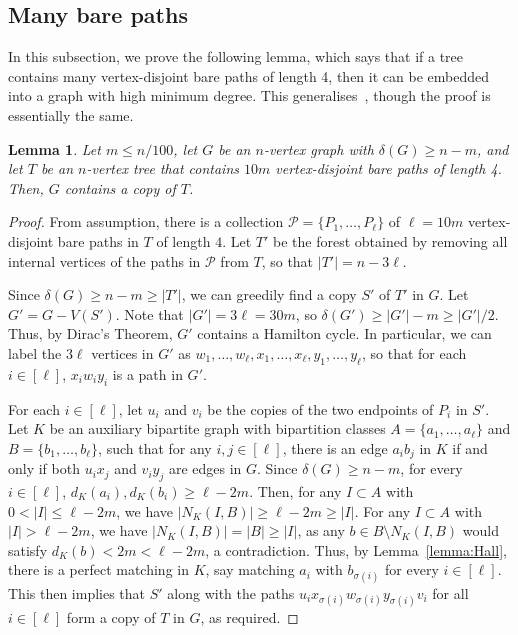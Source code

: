 \documentclass{article}
\theoremstyle{plain}
\newtheorem{lemma}[theorem]{Lemma}
\theoremstyle{definition}
\numberwithin{equation}{section}
\begin{document}
\subsection{Many bare paths}\label{sec:barepath}
In this subsection, we prove the following lemma, which says that if a tree contains many vertex-disjoint bare paths of length 4, then it can be embedded into a graph with high minimum degree. This generalises~{\cite[Lemma 6.1]{MPY}}, though the proof is essentially the same.
\begin{lemma}\label{lemma:bare-paths}
Let $m\leq n/100$, let $G$ be an $n$-vertex graph with $\delta(G)\ge n-m$, and let $T$ be an $n$-vertex tree that contains $10m$ vertex-disjoint bare paths of length 4. Then, $G$ contains a copy of $T$.
\end{lemma}
\begin{proof}
From assumption, there is a collection $\mathcal P=\{P_1,\ldots,P_\ell\}$ of $\ell=10m$ vertex-disjoint bare paths in $T$ of length $4$. Let $T'$ be the forest obtained by removing all internal vertices of the paths in $\mathcal P$ from $T$, so that $|T'|=n-3\ell$.

Since $\delta(G)\geq n-m\geq |T'|$, we can greedily find a copy $S'$ of $T'$ in $G$. Let $G'=G-V(S')$. Note that $|G'|=3\ell=30m$, so $\delta(G')\geq|G'|-m\geq|G'|/2$. Thus, by Dirac's Theorem, $G'$ contains a Hamilton cycle. In particular, we can label the $3\ell$ vertices in $G'$ as $w_1,\ldots,w_\ell,x_1,\ldots,x_\ell,y_1,\ldots,y_\ell$, so that for each $i\in [\ell]$, $x_iw_iy_i$ is a path in $G'$.

For each $i\in [\ell]$, let $u_i$ and $v_i$ be the copies of the two endpoints of $P_i$ in $S'$. Let $K$ be an auxiliary bipartite graph with bipartition classes $A=\{a_1,\ldots,a_\ell\}$ and $B=\{b_1,\ldots,b_\ell\}$, such that for any $i,j\in[\ell]$, there is an edge $a_ib_j$ in $K$ if and only if both $u_ix_j$ and $v_iy_j$ are edges in $G$. Since $\delta(G)\geq n-m$, for every $i\in[\ell]$, $d_K(a_i),d_K(b_i)\geq\ell-2m$. Then, for any $I\subset A$ with $0<|I|\leq\ell-2m$, we have $|N_K(I,B)|\geq\ell-2m\geq |I|$. For any $I\subset A$ with $|I|>\ell-2m$, we have $|N_K(I,B)|=|B|\geq|I|$, as any $b\in B\setminus N_K(I,B)$ would satisfy $d_K(b)<2m<\ell-2m$, a contradiction. Thus, by Lemma~\ref{lemma:Hall}, there is a perfect matching in $K$, say matching $a_i$ with $b_{\sigma(i)}$ for every $i\in[\ell]$. This then implies that $S'$ along with the paths $u_ix_{\sigma(i)}w_{\sigma(i)}y_{\sigma(i)}v_i$ for all $i\in[\ell]$ form a copy of $T$ in $G$, as required.
\end{proof}
\end{document}
